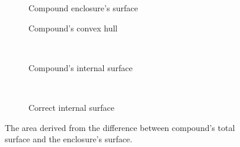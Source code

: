             \begin{wrapfigure}{l}{0.4\textwidth}
                \centering

                \begin{subfigure}[b]{.33\textwidth}
                    \centering
                    \begin{tikzpicture}[x=1mm,y=1mm,scale=0.041]
                         
                    \end{tikzpicture}
                    \caption{Compound enclosure's surface}
                    \label{fig:comp-wall}
                \end{subfigure}

                \vspace{0.02\textheight}

                \begin{subfigure}[b]{.33\textwidth}
                    \centering
                    \begin{tikzpicture}[x=1mm,y=1mm,scale=0.17]
                         
                    \end{tikzpicture}
                    \caption{Compound's convex hull}
                    \label{fig:comp-hull}
                \end{subfigure}\hfill\\

                \vspace{0.02\textheight}

                \begin{subfigure}[b]{.33\textwidth}
                    \centering
                    \begin{tikzpicture}[x=1mm,y=1mm,scale=0.045]
                         
                    \end{tikzpicture}
                    \caption{Compound's internal surface}
                    \label{fig:comp-area}
                \end{subfigure}\hfill\\

                \vspace{0.02\textheight}

                \begin{subfigure}[b]{.33\textwidth}
                    \centering
                    \begin{tikzpicture}[x=1mm,y=1mm,scale=0.07]
                         
                    \end{tikzpicture}
                    \caption{Correct internal surface}
                    \label{fig:comp-ang-area}
                \end{subfigure}

                \caption[Deriving compound area as the difference between total occupied surface and the enclosure's surface]{The area derived from the difference between compound's total surface and the enclosure's surface.}
                \label{fig:comp}

                \vspace{-0.07\textheight}
            \end{wrapfigure}


